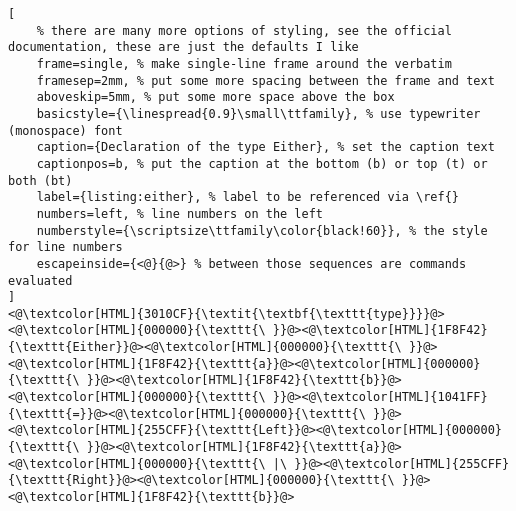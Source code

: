 \begin{lstlisting}[
	% there are many more options of styling, see the official documentation, these are just the defaults I like
	frame=single, % make single-line frame around the verbatim
	framesep=2mm, % put some more spacing between the frame and text
	aboveskip=5mm, % put some more space above the box
	basicstyle={\linespread{0.9}\small\ttfamily}, % use typewriter (monospace) font
	caption={Declaration of the type Either}, % set the caption text
	captionpos=b, % put the caption at the bottom (b) or top (t) or both (bt)
    label={listing:either}, % label to be referenced via \ref{}
	numbers=left, % line numbers on the left
	numberstyle={\scriptsize\ttfamily\color{black!60}}, % the style for line numbers
	escapeinside={<@}{@>} % between those sequences are commands evaluated
]
<@\textcolor[HTML]{3010CF}{\textit{\textbf{\texttt{type}}}}@><@\textcolor[HTML]{000000}{\texttt{\ }}@><@\textcolor[HTML]{1F8F42}{\texttt{Either}}@><@\textcolor[HTML]{000000}{\texttt{\ }}@><@\textcolor[HTML]{1F8F42}{\texttt{a}}@><@\textcolor[HTML]{000000}{\texttt{\ }}@><@\textcolor[HTML]{1F8F42}{\texttt{b}}@><@\textcolor[HTML]{000000}{\texttt{\ }}@><@\textcolor[HTML]{1041FF}{\texttt{=}}@><@\textcolor[HTML]{000000}{\texttt{\ }}@><@\textcolor[HTML]{255CFF}{\texttt{Left}}@><@\textcolor[HTML]{000000}{\texttt{\ }}@><@\textcolor[HTML]{1F8F42}{\texttt{a}}@><@\textcolor[HTML]{000000}{\texttt{\ |\ }}@><@\textcolor[HTML]{255CFF}{\texttt{Right}}@><@\textcolor[HTML]{000000}{\texttt{\ }}@><@\textcolor[HTML]{1F8F42}{\texttt{b}}@>

\end{lstlisting}